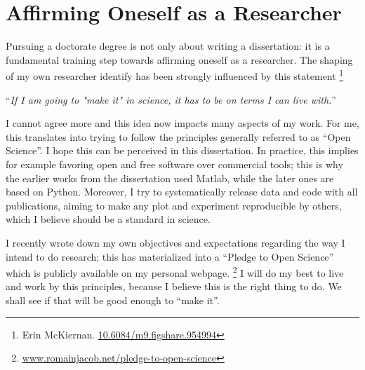 \newpage
\section{Affirming Oneself as a Researcher}

Pursuing a doctorate degree is not only about writing a dissertation: it is a fundamental training step towards affirming oneself as a researcher.
The shaping of my own researcher identify has been strongly influenced by this statement%
\footnote{Erin McKiernan. \href{http://dx.doi.org/10.6084/m9.figshare.954994}{10.6084/m9.figshare.954994}}
\begin{center}
  ``\emph{If I am going to "make it" in science, it has to be on terms I can live with.}''
\end{center}
I cannot agree more and this idea now impacts many aspects of my work.\linebreak
For me, this translates into trying to follow the principles generally referred to as ``Open Science''. I hope this can be perceived in this dissertation.
In practice, this implies for example favoring open and free software over commercial tools; this is why the earlier works from the dissertation used Matlab, while the later ones are based on Python.
Moreover, I try to systematically release data and code with all publications, aiming to make any plot and experiment reproducible by others, which I believe should be a standard in science.

I recently wrote down my own objectives and expectations regarding the way I intend to do research; this has materialized into a ``Pledge to Open Science'' which is publicly available on my personal webpage.%
%
\footnote{\href{http://www.romainjacob.net/pledge-to-open-science/}{www.romainjacob.net/pledge-to-open-science}}
%
I will do my best to live and work by this principles, because I believe this is the right thing to do. \linebreak
We shall see if that will be good enough to ``make it''.
